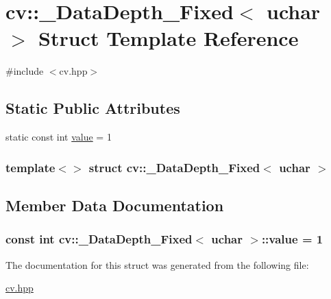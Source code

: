 \hypertarget{structcv_1_1___data_depth___fixed_3_01uchar_01_4}{\section{cv\-:\-:\-\_\-\-Data\-Depth\-\_\-\-Fixed$<$ uchar $>$ Struct Template Reference}
\label{structcv_1_1___data_depth___fixed_3_01uchar_01_4}
}


{\ttfamily \#include $<$cv.\-hpp$>$}

\subsection*{Static Public Attributes}
\begin{DoxyCompactItemize}
\item 
static const int \hyperlink{structcv_1_1___data_depth___fixed_3_01uchar_01_4_a9c65363d3d9a38e55853a64366a675cf}{value} = 1
\end{DoxyCompactItemize}
\subsubsection*{template$<$$>$ struct cv\-::\-\_\-\-Data\-Depth\-\_\-\-Fixed$<$ uchar $>$}



\subsection{Member Data Documentation}
\hypertarget{structcv_1_1___data_depth___fixed_3_01uchar_01_4_a9c65363d3d9a38e55853a64366a675cf}{
\subsubsection[{value}]{\setlength{\rightskip}{0pt plus 5cm}const int {\bf cv\-::\-\_\-\-Data\-Depth\-\_\-\-Fixed}$<$ uchar $>$\-::{\bf value} = 1}}\label{structcv_1_1___data_depth___fixed_3_01uchar_01_4_a9c65363d3d9a38e55853a64366a675cf}


The documentation for this struct was generated from the following file\-:\begin{DoxyCompactItemize}
\item 
\hyperlink{cv_8hpp}{cv.\-hpp}\end{DoxyCompactItemize}
